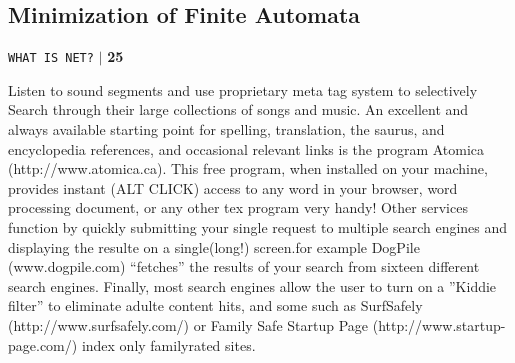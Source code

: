 \documentclass[a4,9pt]{beamer}
\begin{document}
\begin{frame}
\section*{Minimization of Finite Automata}
\begin{flushright}
 \texttt{WHAT IS NET?} \hspace*{0.1cm}\textbf{$|$} \hspace*{0.1cm} \textbf{25}\hspace*{0.1cm}
\end{flushright}
\vspace*{1cm}
Listen to sound segments and use proprietary meta tag system to selectively
Search through their large collections of songs and music.
An excellent and always available starting point for spelling, translation, the
saurus, and encyclopedia references, and occasional relevant links is the program
Atomica (http://www.atomica.ca). This free program, when installed on your
machine, provides instant (ALT CLICK) access to any word in your browser,
word processing document, or any other tex program very handy!
Other services function by quickly submitting your single request to multiple
search engines and displaying the resulte on a single(long!) screen.for example
DogPile (www.dogpile.com) “fetches” the results of your search from sixteen different
search engines.
Finally, most search engines allow the user to turn on a ”Kiddie filter” to eliminate
adulte content hits, and some such as SurfSafely (http://www.surfsafely.com/)
or Family Safe Startup Page (http://www.startup-page.com/) index only familyrated
sites.
\end{frame}
\end{document}
